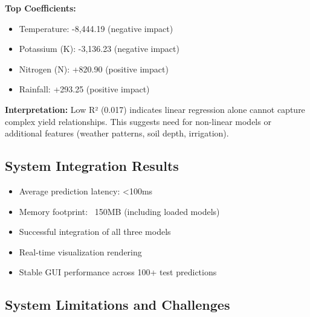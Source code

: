 \documentclass[conference]{IEEEtran}
\begin{document}
\textbf{Top Coefficients:}
\begin{itemize}
    \item Temperature: -8,444.19 (negative impact)
    \item Potassium (K): -3,136.23 (negative impact)
    \item Nitrogen (N): +820.90 (positive impact)
    \item Rainfall: +293.25 (positive impact)
\end{itemize}

\textbf{Interpretation:} Low R² (0.017) indicates linear regression alone cannot capture complex yield relationships. This suggests need for non-linear models or additional features (weather patterns, soil depth, irrigation).

\subsection{System Integration Results}
\begin{itemize}
    \item Average prediction latency: <100ms
    \item Memory footprint: ~150MB (including loaded models)
    \item Successful integration of all three models
    \item Real-time visualization rendering
    \item Stable GUI performance across 100+ test predictions
\end{itemize}

\subsection{System Limitations and Challenges}
\end{document}
